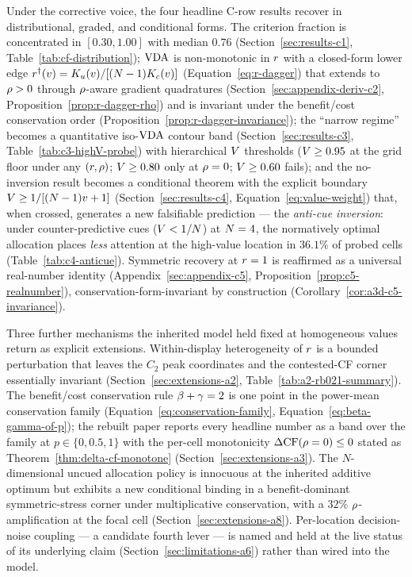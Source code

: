 Under the corrective voice, the four headline C-row results recover
in distributional, graded, and conditional forms.  The criterion
fraction is concentrated in $[0.30, 1.00]$ with median $0.76$
(Section~\ref{sec:results-c1}, Table~\ref{tab:cf-distribution});
$\mathrm{VDA}$ is non-monotonic in $r$ with a closed-form lower edge
$r^{\dagger}(v) = K_u(v) / [(N - 1) K_c(v)]$
(Equation~\eqref{eq:r-dagger}) that extends to $\rho > 0$ through
$\rho$-aware gradient quadratures
(Section~\ref{sec:appendix-deriv-c2},
Proposition~\ref{prop:r-dagger-rho}) and is invariant under the
benefit/cost conservation order
(Proposition~\ref{prop:r-dagger-invariance}); the ``narrow regime''
becomes a quantitative iso-$\mathrm{VDA}$ contour band
(Section~\ref{sec:results-c3}, Table~\ref{tab:c3-highV-probe}) with
hierarchical $V$ thresholds ($V \ge 0.95$ at the grid floor
under any $(r, \rho)$; $V \ge 0.80$ only at $\rho = 0$;
$V \ge 0.60$ fails); and the no-inversion result becomes a
conditional theorem with the explicit boundary
$V \ge 1 / [(N - 1) v + 1]$
(Section~\ref{sec:results-c4}, Equation~\eqref{eq:value-weight})
that, when crossed, generates a new falsifiable prediction --- the
\emph{anti-cue inversion}: under counter-predictive cues
($V < 1/N$) at $N = 4$, the normatively optimal
allocation places \emph{less} attention at the high-value location
in $36.1\%$ of probed cells (Table~\ref{tab:c4-anticue}).  Symmetric
recovery at $r = 1$ is reaffirmed as a universal real-number
identity (Appendix~\ref{sec:appendix-c5},
Proposition~\ref{prop:c5-realnumber}), conservation-form-invariant by
construction (Corollary~\ref{cor:a3d-c5-invariance}).

Three further mechanisms the inherited model held fixed at
homogeneous values return as explicit extensions.
Within-display heterogeneity of $r$ is a bounded perturbation
that leaves the $C_2$ peak coordinates and the contested-CF corner
essentially invariant (Section~\ref{sec:extensions-a2},
Table~\ref{tab:a2-rb021-summary}).  The benefit/cost conservation
rule $\beta + \gamma = 2$ is one point in the power-mean
conservation family
(Equation~\eqref{eq:conservation-family},
Equation~\eqref{eq:beta-gamma-of-p}); the rebuilt paper reports
every headline number as a band over the family at
$p \in \{0, 0.5, 1\}$ with the per-cell monotonicity
$\Delta \mathrm{CF}(\rho = 0) \le 0$ stated as
Theorem~\ref{thm:delta-cf-monotone}
(Section~\ref{sec:extensions-a3}).  The $N$-dimensional uncued
allocation policy is innocuous at the inherited additive optimum but
exhibits a new conditional binding in a benefit-dominant
symmetric-stress corner under multiplicative conservation, with a
$32\%$ $\rho$-amplification at the focal cell
(Section~\ref{sec:extensions-a8}).  Per-location decision-noise
coupling --- a candidate fourth lever
--- is named and held at the live status of its underlying claim
(Section~\ref{sec:limitations-a6}) rather than wired into the model.

